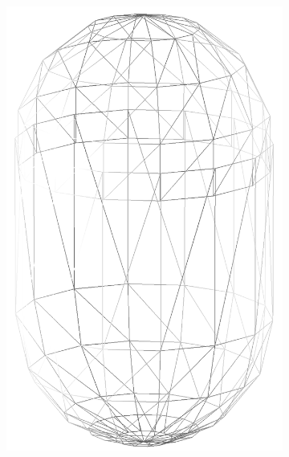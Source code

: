 \begin{figure}
\begin{center}
\begin{subfigure}{0.24\textwidth}
    \includegraphics[width=\linewidth]{assets/images/shapes/bugold/bad_mesh_med_w}
    \caption{}
    \end{subfigure}
    \begin{subfigure}{0.24\textwidth}

\end{subfigure}
\end{center}
\end{figure}
